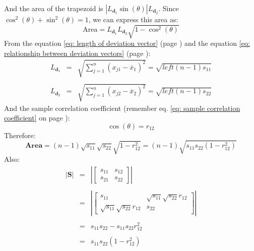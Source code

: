 \documentclass[a4paper]{article}
\begin{document}
    \noindent
    And the area of the trapezoid is $\left| L_{\mathbf{d}_{1}} \sin\left(\theta\right) \right| L_{\mathbf{d}_{2}}$. Since $\cos^{2}\left(\theta\right) + \sin^{2}\left(\theta\right) = 1$, we can express this area as:
    \begin{equation*}
        \text{Area} = L_{\mathbf{d}_{1}} L_{\mathbf{d}_{2}} \sqrt{1 - \cos^{2}\left(\theta\right)}
    \end{equation*}
    From the equation \ref{eq: length of deviation vector} (page \pageref{eq: length of deviation vector}) and the equation \ref{eq: relationship between deviation vectors} (page \pageref{eq: relationship between deviation vectors}):
    \begin{equation*}
        \begin{array}{rcl}
            L_{\mathbf{d}_{1}} &=& \sqrt{\displaystyle \sum_{j=1}^{n} \left(x_{j1} - \overline{x}_{1}\right)^{2}} = \sqrt{left(n-1)s_{11}} \\
            \\
            L_{\mathbf{d}_{2}} &=& \sqrt{\displaystyle \sum_{j=1}^{n} \left(x_{j2} - \overline{x}_{2}\right)^{2}} = \sqrt{left(n-1)s_{22}}
        \end{array}
    \end{equation*}
    And the sample correlation coefficient (remember eq. \ref{eq: sample correlation coefficient} on page \pageref{eq: sample correlation coefficient}):
    \begin{equation*}
        \cos\left(\theta\right) = r_{12}
    \end{equation*}
    Therefore:
    \begin{equation}
        \mathbf{Area} = \left(n-1\right) \sqrt{s_{11}} \sqrt{s_{22}} \sqrt{1 - r_{12}^{2}} = \left(n-1\right) \sqrt{s_{11}s_{22}\left(1 - r^{2}_{12}\right)}
    \end{equation}
    Also:
    \begin{equation}
        \begin{array}{rcl}
            \left| \mathbf{S} \right| &=& \left| 
                \begin{bmatrix}
                    s_{11} & s_{12} \\ s_{21} & s_{22}
                \end{bmatrix}
            \right| \\
            \\
            &=& \left| 
                \begin{bmatrix}
                    s_{11} & \sqrt{s_{11}}\sqrt{s_{22}}r_{12} \\
                    \sqrt{s_{11}}\sqrt{s_{22}}r_{12} & s_{22}
                \end{bmatrix}
             \right| \\
             \\
             &=& s_{11}s_{22} - s_{11}s_{22}r_{12}^{2} \\
             \\
             &=& s_{11}s_{22}\left(1 - r_{12}^{2}\right)
        \end{array}
    \end{equation}
\end{document}
